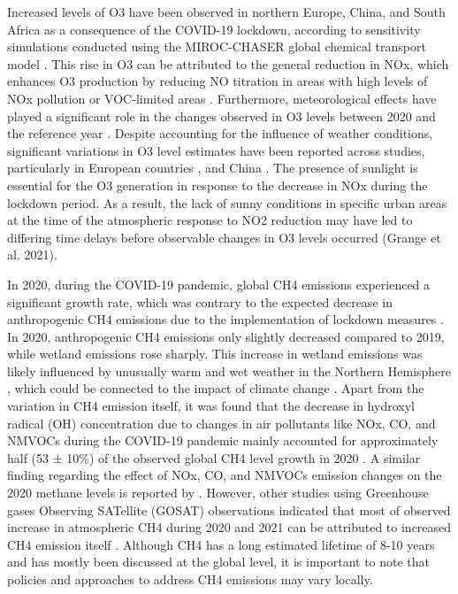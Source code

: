 Increased levels of O3 have been observed in northern Europe, China, and South Africa as a consequence of the COVID-19 lockdown, according to sensitivity simulations conducted using the MIROC-CHASER global chemical transport model \citep{miyazaki2021global}. This rise in O3 can be attributed to the general reduction in NOx, which enhances O3 production by reducing NO titration in areas with high levels of NOx pollution or VOC-limited areas \citep{akimoto2022rethinking}. Furthermore, meteorological effects have played a significant role in the changes observed in O3 levels between 2020 and the reference year \citep{ordonez2020early,liu2021diverse}. Despite accounting for the influence of weather conditions, significant variations in O3 level estimates have been reported across studies, particularly in European countries \citep{ordonez2020early,grange2021covid}, and China \citep{liu2021diverse,shi2021abrupt}. The presence of sunlight is essential for the O3 generation in response to the decrease in NOx during the lockdown period. As a result, the lack of sunny conditions in specific urban areas at the time of the atmospheric response to NO2 reduction may have led to differing time delays before observable changes in O3 levels occurred \citep{grange2021covid} (Grange et al. 2021). \par

In 2020, during the COVID-19 pandemic, global CH4 emissions experienced a significant growth rate, which was contrary to the expected decrease in anthropogenic CH4 emissions due to the implementation of lockdown measures \citep{peng2022wetland}.  In 2020, anthropogenic CH4 emissions only slightly decreased compared to 2019, while wetland emissions rose sharply. This increase in wetland emissions was likely influenced by unusually warm and wet weather in the Northern Hemisphere \citep{peng2022wetland}, which could be connected to the impact of climate change \citep{zhang2023recent}. Apart from the variation in CH4 emission itself, it was found that the decrease in hydroxyl radical (OH) concentration due to changes in air pollutants like NOx, CO, and NMVOCs during the COVID-19 pandemic mainly accounted for approximately half (53 ± 10\%) of the observed global CH4 level growth in 2020 \citep{peng2022wetland}. A similar finding regarding the effect of NOx, CO, and NMVOCs emission changes on the 2020 methane levels is reported by \citep{stevenson2022covid}. However, other studies using Greenhouse gases Observing SATellite (GOSAT) observations indicated that most of observed increase in atmospheric CH4 during 2020 and 2021 can be attributed to increased CH4 emission itself \citep{qu2022attribution,feng2023methane}. Although CH4 has a long estimated lifetime of 8-10 years and has mostly been discussed at the global level, it is important to note that policies and approaches to address CH4 emissions may vary locally. \par

